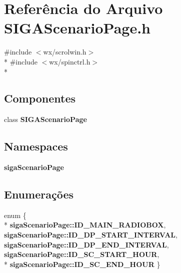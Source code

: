 \section{Referência do Arquivo S\+I\+G\+A\+Scenario\+Page.\+h}
\label{_s_i_g_a_scenario_page_8h}
{\ttfamily \#include $<$wx/scrolwin.\+h$>$}\\*
{\ttfamily \#include $<$wx/spinctrl.\+h$>$}\\*
\subsection*{Componentes}
\begin{DoxyCompactItemize}
\item 
class {\bf S\+I\+G\+A\+Scenario\+Page}
\end{DoxyCompactItemize}
\subsection*{Namespaces}
\begin{DoxyCompactItemize}
\item 
 {\bf siga\+Scenario\+Page}
\end{DoxyCompactItemize}
\subsection*{Enumerações}
\begin{DoxyCompactItemize}
\item 
enum \{ \\*
{\bf siga\+Scenario\+Page\+::\+I\+D\+\_\+\+M\+A\+I\+N\+\_\+\+R\+A\+D\+I\+O\+B\+OX}, 
{\bf siga\+Scenario\+Page\+::\+I\+D\+\_\+\+D\+P\+\_\+\+S\+T\+A\+R\+T\+\_\+\+I\+N\+T\+E\+R\+V\+AL}, 
{\bf siga\+Scenario\+Page\+::\+I\+D\+\_\+\+D\+P\+\_\+\+E\+N\+D\+\_\+\+I\+N\+T\+E\+R\+V\+AL}, 
{\bf siga\+Scenario\+Page\+::\+I\+D\+\_\+\+S\+C\+\_\+\+S\+T\+A\+R\+T\+\_\+\+H\+O\+UR}, 
\\*
{\bf siga\+Scenario\+Page\+::\+I\+D\+\_\+\+S\+C\+\_\+\+E\+N\+D\+\_\+\+H\+O\+UR}
 \}
\end{DoxyCompactItemize}
